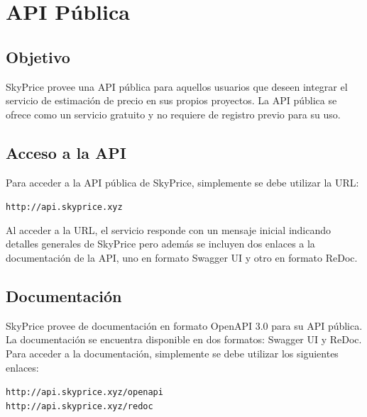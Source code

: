 
\chapter{\textcolor{azulescom}{API Pública}}

\section{Objetivo}
SkyPrice provee una API pública para aquellos usuarios que deseen integrar el
servicio de estimación de precio en sus propios proyectos. La API pública
se ofrece como un servicio gratuito y no requiere de registro previo para su uso.

\section{Acceso a la API}
Para acceder a la API pública de SkyPrice, simplemente se debe utilizar la URL:

\begin{center}
\texttt{http://api.skyprice.xyz}
\end{center}

Al acceder a la URL, el servicio responde con un mensaje inicial indicando detalles
generales de SkyPrice pero además se incluyen dos enlaces a la documentación de la API,
uno en formato Swagger UI y otro en formato ReDoc.

\section{Documentación}
SkyPrice provee de documentación en formato OpenAPI 3.0 para su API pública. La
documentación se encuentra disponible en dos formatos: Swagger UI y ReDoc. Para
acceder a la documentación, simplemente se debe utilizar los siguientes enlaces:

\begin{center}
\texttt{http://api.skyprice.xyz/openapi} \\
\texttt{http://api.skyprice.xyz/redoc}
\end{center}

